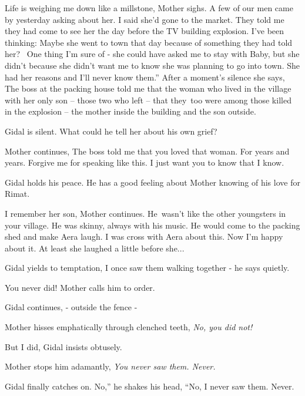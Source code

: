 \documentclass[letterpaper]{article}
\begin{document}
{\textquotedbl}Life is weighing me down{ }like a millstone,{\textquotedbl}
Mother sighs. {\textquotedbl}A few of our men came by yesterday asking about her. I said she'd gone to the market. They
told me they had come to see her the day before the TV building explosion. I've been thinking: Maybe she went to town
that day because of something they had told her? ~One thing I'm sure of - she could have asked me to stay with Baby,
but she didn't because she didn't want me to know she was planning to go into town. She had her reasons and I'll never
know them.'' After a moment's silence she says, {\textquotedbl}The boss at the packing house told me that the woman who
lived in the village with her only son -- those two who left -- that they~too were among those killed in the explosion
-- the mother inside the building and the son outside.{\textquotedbl} 

Gidal is silent. What could he tell her about his own grief? ~

Mother continues, {\textquotedbl}The boss told me that you loved that woman. For years and years. Forgive me for
speaking like this. I just want you to know that I know.{\textquotedbl} 

Gidal holds his peace. He has a good feeling about Mother knowing of his love for Rimat. 

{\textquotedbl}I remember her son,{\textquotedbl} Mother continues. {\textquotedbl}He~wasn't like the other youngsters
in your village. He was skinny, always with his{ music}. He would come to the
packing shed and make Aera laugh. I was cross with Aera about this. Now I'm happy about it. At least she laughed a
little before she... {\textquotedbl} 

Gidal yields to temptation, {\textquotedbl}I once saw them walking together -{\textquotedbl} he says quietly.

{\textquotedbl}You never did!{\textquotedbl} Mother calls him to order.

Gidal continues, {\textquotedbl}- outside the fence -{\textquotedbl} 

Mother hisses emphatically through clenched teeth, {\textquotedbl}\textit{No, you did not!}{\textquotedbl} 

{\textquotedbl}But I did,{\textquotedbl} Gidal insists obtusely. 

Mother stops him adamantly, {\textquotedbl}\textit{You never saw them. Never.}{\textquotedbl} 

Gidal finally catches on. {\textquotedbl}No,'' he shakes his head, ``No, I never saw them. Never.{\textquotedbl} 
\end{document}
